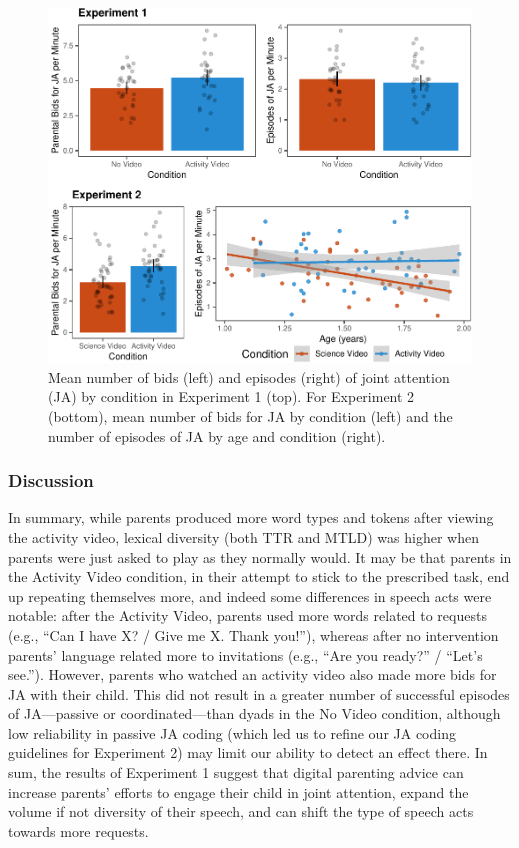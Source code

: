 \documentclass[man,floatsintext]{apa6}
\begin{document}
\begin{figure}[H]

{\centering \includegraphics{figs/fig-JA-1} 

}

\caption{\label{fig:JA} Mean number of bids (left) and episodes (right) of joint attention (JA) by condition in Experiment 1 (top). For Experiment 2 (bottom), mean number of bids for JA by condition (left) and the number of episodes of JA by age and condition (right).}\label{fig:fig-JA}
\end{figure}

\hypertarget{discussion}{%
\subsubsection{Discussion}\label{discussion}}

In summary, while parents produced more word types and tokens after viewing the activity video, lexical diversity (both TTR and MTLD) was higher when parents were just asked to play as they normally would.
It may be that parents in the Activity Video condition, in their attempt to stick to the prescribed task, end up repeating themselves more, and indeed some differences in speech acts were notable:
after the Activity Video, parents used more words related to requests (e.g., \enquote{Can I have X? / Give me X. Thank you!}), whereas after no intervention parents' language related more to invitations (e.g., \enquote{Are you ready?} / \enquote{Let's see.}).
However, parents who watched an activity video also made more bids for JA with their child.
This did not result in a greater number of successful episodes of JA---passive or coordinated---than dyads in the No Video condition, although low reliability in passive JA coding (which led us to refine our JA coding guidelines for Experiment 2) may limit our ability to detect an effect there.
In sum, the results of Experiment 1 suggest that digital parenting advice can increase parents' efforts to engage their child in joint attention, expand the volume if not diversity of their speech, and can shift the type of speech acts towards more requests.
\end{document}
